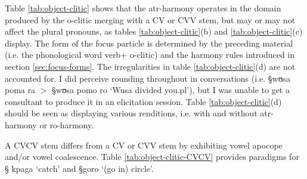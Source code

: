 Table \ref{tab:object-clitic} shows that the {\sc atr}-harmony 
operates in the domain produced by the {\sc
o}-clitic merging with a CV or CVV stem, but may or may not affect the
plural pronouns, as tables \ref{tab:object-clitic}(b) and 
\ref{tab:object-clitic}(c) display. The form of the focus particle is determined
by
the preceding material (i.e. the phonological word  verb+{\sc
o}-clitic) and the harmony rules introduced in
section
\ref{sec:focus-forms}.  The irregularities in table \ref{tab:object-clitic}(d)
are not accounted for.  I did perceive rounding throughout in conversations
(i.e.  {\S wʊsa poma ra} $>$ {\S wʊsa pomo ro} `Wusa divided you.{\sc pl}'), but
I was unable to get a consultant to produce it in an elicitation session. Table
\ref{tab:object-clitic}(d) should be seen as displaying various renditions,
i.e. with and without {\sc atr-}harmony or {\sc ro-}harmony.


A CVCV stem differs from a CV or CVV stem by exhibiting vowel apocope and/or 
vowel
coalescence.  Table \ref{tab:object-clitic-CVCV} provides paradigms for {\S
kpaga} `catch' and {\S goro} `(go in) circle'. 



